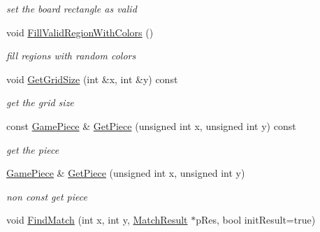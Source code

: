 \begin{DoxyCompactItemize}
\begin{DoxyCompactList}\small\item\em set the board rectangle as valid \end{DoxyCompactList}\item 
\hypertarget{class_game_board_a543bd5dbfa8b27bac058dd1aa8f4b40f}{void \hyperlink{class_game_board_a543bd5dbfa8b27bac058dd1aa8f4b40f}{Fill\-Valid\-Region\-With\-Colors} ()}\label{class_game_board_a543bd5dbfa8b27bac058dd1aa8f4b40f}

\begin{DoxyCompactList}\small\item\em fill regions with random colors \end{DoxyCompactList}\item 
\hypertarget{class_game_board_a345d5c2d3492cc61a9e67b8e85c4be9d}{void \hyperlink{class_game_board_a345d5c2d3492cc61a9e67b8e85c4be9d}{Get\-Grid\-Size} (int \&x, int \&y) const }\label{class_game_board_a345d5c2d3492cc61a9e67b8e85c4be9d}

\begin{DoxyCompactList}\small\item\em get the grid size \end{DoxyCompactList}\item 
\hypertarget{class_game_board_ae28369d503321f0f2cd444a87aa661a3}{const \hyperlink{class_game_piece}{Game\-Piece} \& \hyperlink{class_game_board_ae28369d503321f0f2cd444a87aa661a3}{Get\-Piece} (unsigned int x, unsigned int y) const }\label{class_game_board_ae28369d503321f0f2cd444a87aa661a3}

\begin{DoxyCompactList}\small\item\em get the piece \end{DoxyCompactList}\item 
\hypertarget{class_game_board_a14316a2356cc7ed2e0c7b89d250591b2}{\hyperlink{class_game_piece}{Game\-Piece} \& \hyperlink{class_game_board_a14316a2356cc7ed2e0c7b89d250591b2}{Get\-Piece} (unsigned int x, unsigned int y)}\label{class_game_board_a14316a2356cc7ed2e0c7b89d250591b2}

\begin{DoxyCompactList}\small\item\em non const get piece \end{DoxyCompactList}\item 
\hypertarget{class_game_board_a5c0cb4b99b238d5eb818e67a5db65601}{void \hyperlink{class_game_board_a5c0cb4b99b238d5eb818e67a5db65601}{Find\-Match} (int x, int y, \hyperlink{struct_game_board_1_1_match_result}{Match\-Result} $\ast$p\-Res, bool init\-Result=true)}\label{class_game_board_a5c0cb4b99b238d5eb818e67a5db65601}


\end{DoxyCompactItemize}
